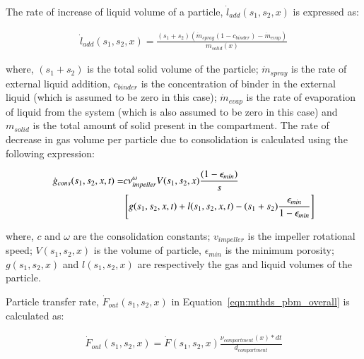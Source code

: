 \documentclass[preprint,11pt,authoryear]{elsarticle}
\begin{document}
The rate of increase of liquid volume of a particle, $\dot{l}_{add}(s_1,s_2,x)$ is expressed as:

\begin{align}
\dot{l}_{add}(s_1,s_2,x) = \frac{(s_1+s_2)(\dot{m}_{spray}(1-c_{binder})-\dot{m}_{evap})}{m_{solid}(x)}
\end{align}

where, $(s_1+s_2)$  is the total solid volume of the particle; $\dot{m}_{spray}$ is the rate of external 
liquid addition, $c_{binder}$ is the concentration of binder in the external liquid (which is assumed to 
be zero in this case); $\dot{m}_{evap}$ is the rate of evaporation of liquid from 
the system (which is also assumed to be zero in this case) and $m_{solid}$ is the total amount of solid 
present in the compartment.
The rate of decrease in gas volume per particle due to consolidation is calculated using the 
following expression:~\citep{Verkoeijen2002} 

\begin{align}
\dot{g}_{cons}(s_1,s_2,x,t)=& c \nu_{impeller}^{\omega}V(s_1,s_2,x)\frac{(1-\epsilon_{min})}{s} 
\notag \\ 
& \left[g(s_1,s_2,x,t)+l(s_1,s_2,x,t) -(s_1+s_2)\frac{\epsilon_{min}}{1-\epsilon_{min}}\right]
\end{align}        

 where, $c$ and $\omega$ are the consolidation constants; $v_{impeller}$ is the impeller 
rotational speed; $V(s_1,s_2,x)$ is the volume of particle, $\epsilon_{min}$ is the minimum porosity; 
$g(s_1,s_2,x)$ and $l(s_1,s_2,x)$ are respectively the gas and liquid volumes of the particle.

Particle transfer rate, $\dot{F}_{out}(s_1,s_2,x)$ in Equation~\ref{eqn:mthds_pbm_overall} is calculated 
as:

\begin{align}
\dot{F}_{out}(s_1,s_2,x) = \dot{F}(s_1,s_2,x)\frac{\nu_{compartment}(x)*dt}{d_{compartment}}
\end{align}
\end{document}
